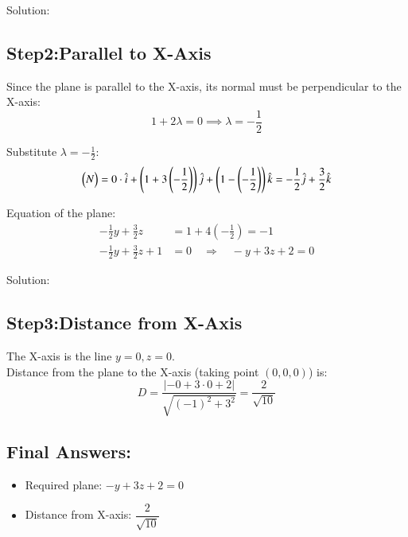 \documentclass{beamer}
\begin{document}
\begin{frame}{Solution:}
\subsection*{Step2:Parallel to X-Axis}

Since the plane is parallel to the X-axis, its normal must be perpendicular to the X-axis:
\begin{equation}
1 + 2\lambda = 0 \implies \lambda = -\frac{1}{2}
\label{eq:lambda}
\end{equation}

Substitute $\lambda = -\frac{1}{2}$:
\begin{equation}
\begin{pmatrix}N\end{pmatrix} = 0 \cdot \hat{i} + \left(1 + 3\left(-\frac{1}{2}\right)\right)\hat{j} + \left(1 - \left(-\frac{1}{2}\right)\right)\hat{k} 
= -\frac{1}{2}\hat{j} + \frac{3}{2}\hat{k}
\label{eq:normal_final}
\end{equation}

Equation of the plane:
\begin{align}
-\frac{1}{2}y + \frac{3}{2}z &= 1 + 4\left(-\frac{1}{2}\right) = -1 \label{eq:plane_eq1} \\
-\frac{1}{2}y + \frac{3}{2}z + 1 &= 0 \quad \Rightarrow \quad -y + 3z + 2 = 0 \label{eq:plane_eq2}
\end{align}
\end{frame}

\begin{frame}{Solution:}
\subsection*{Step3:Distance from X-Axis}

The X-axis is the line $y=0, z=0$.\\
Distance from the plane to the X-axis (taking point $(0,0,0)$) is:
\begin{equation}
D = \frac{| -0 + 3 \cdot 0 + 2 |}{\sqrt{(-1)^2 + 3^2}} = \frac{2}{\sqrt{10}}
\label{eq:distance}
\end{equation}

\subsection*{Final Answers:}

\begin{itemize}
    \item Required plane: $-y + 3z + 2 = 0$ 
    \item Distance from X-axis: $\dfrac{2}{\sqrt{10}}$
\end{itemize}
\end{frame}
\end{document}
